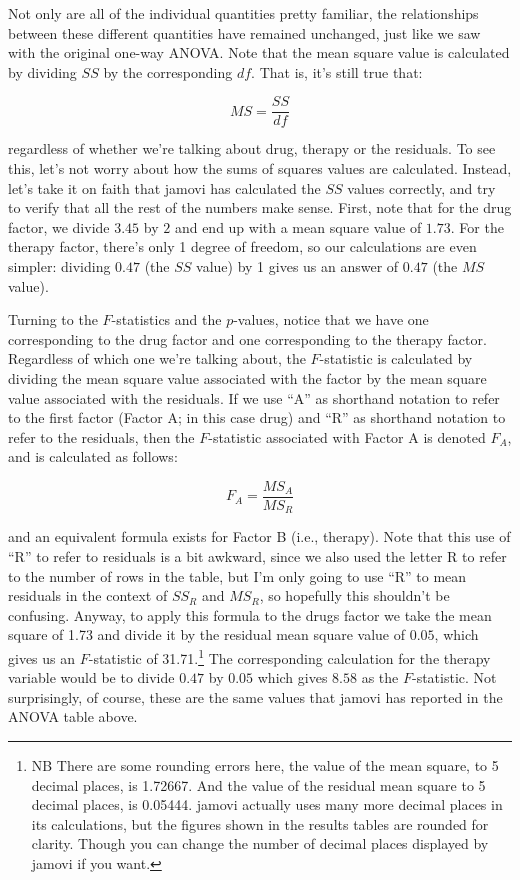 \documentclass[
  a4paper,
]{book}
\begin{document}
Not only are all of the individual quantities pretty familiar, the
relationships between these different quantities have remained
unchanged, just like we saw with the original one-way ANOVA. Note that
the mean square value is calculated by dividing \(SS\) by the
corresponding \(df\). That is, it's still true that:

\[MS=\frac{SS}{df}\]

regardless of whether we're talking about drug, therapy or the
residuals. To see this, let's not worry about how the sums of squares
values are calculated. Instead, let's take it on faith that jamovi has
calculated the \(SS\) values correctly, and try to verify that all the
rest of the numbers make sense. First, note that for the drug factor, we
divide \(3.45\) by \(2\) and end up with a mean square value of
\(1.73\). For the therapy factor, there's only 1 degree of freedom, so
our calculations are even simpler: dividing \(0.47\) (the \(SS\) value)
by 1 gives us an answer of \(0.47\) (the \(MS\) value).

Turning to the \(F\)-statistics and the \(p\)-values, notice that we
have one corresponding to the drug factor and one corresponding to the
therapy factor. Regardless of which one we're talking about, the
\(F\)-statistic is calculated by dividing the mean square value
associated with the factor by the mean square value associated with the
residuals. If we use ``A'' as shorthand notation to refer to the first
factor (Factor A; in this case drug) and ``R'' as shorthand notation to
refer to the residuals, then the \(F\)-statistic associated with Factor
A is denoted \(F_A\), and is calculated as follows:

\[F_A=\frac{MS_A}{MS_R}\]

and an equivalent formula exists for Factor B (i.e., therapy). Note that
this use of ``R'' to refer to residuals is a bit awkward, since we also
used the letter R to refer to the number of rows in the table, but I'm
only going to use ``R'' to mean residuals in the context of \({SS_R}\)
and \({MS_R}\), so hopefully this shouldn't be confusing. Anyway, to
apply this formula to the drugs factor we take the mean square of 1.73
and divide it by the residual mean square value of \(0.05\), which gives
us an \(F\)-statistic of 31.71.\footnote{NB There are some rounding
  errors here, the value of the mean square, to 5 decimal places, is
  1.72667. And the value of the residual mean square to 5 decimal
  places, is 0.05444. jamovi actually uses many more decimal places in
  its calculations, but the figures shown in the results tables are
  rounded for clarity. Though you can change the number of decimal
  places displayed by jamovi if you want.} The corresponding calculation
for the therapy variable would be to divide \(0.47\) by \(0.05\) which
gives \(8.58\) as the \(F\)-statistic. Not surprisingly, of course,
these are the same values that jamovi has reported in the ANOVA table
above.
\end{document}
